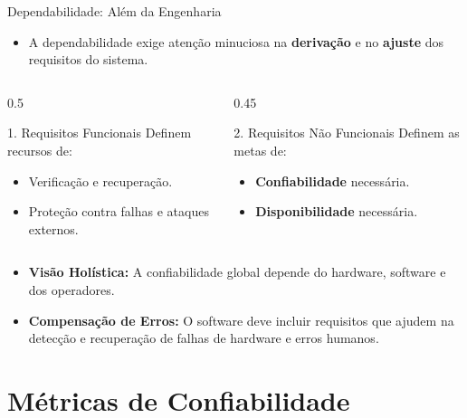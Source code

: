 \documentclass[9pt]{beamer}
\begin{document}
\begin{frame}{Dependabilidade: Além da Engenharia}
    \begin{itemize}
        \item A dependabilidade exige atenção minuciosa na \textbf{derivação} e no \textbf{ajuste} dos requisitos do sistema.
    \end{itemize}

    \begin{columns}[T]
        \begin{column}{0.5\textwidth}
            \begin{block}{1. Requisitos Funcionais}
                \small
                Definem recursos de:
                \begin{itemize}
                    \item Verificação e recuperação.
                    \item Proteção contra falhas e ataques externos.
                \end{itemize}
            \end{block}
        \end{column}
        \begin{column}{0.45\textwidth}
            \begin{block}{2. Requisitos Não Funcionais}
                \small
                Definem as metas de:
                \begin{itemize}
                    \item \textbf{Confiabilidade} necessária.
                    \item \textbf{Disponibilidade} necessária.
                \end{itemize}
            \end{block}
        \end{column}
    \end{columns}

    \begin{itemize}
        \item \textbf{Visão Holística:} A confiabilidade global depende do hardware, software e dos operadores.
        \item \textbf{Compensação de Erros:} O software deve incluir requisitos que ajudem na detecção e recuperação de falhas de hardware e erros humanos.
    \end{itemize}
\end{frame}
\section{Métricas de Confiabilidade}  
\end{document}
